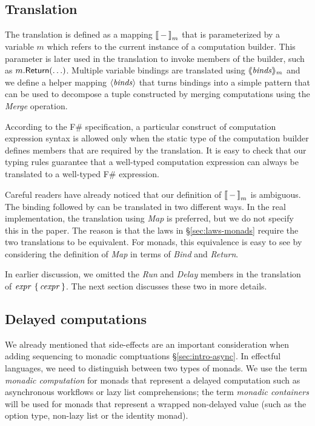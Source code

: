 \documentclass[runningheads,a4paper]{llncs}
\begin{document}

\subsection{Translation}
\label{sec:semantics-transl}

The translation is defined as a mapping $|[ \,-\, |]_m$ that is parameterized by a variable $m$ which
refers to the current instance of a computation builder. This parameter is later used in the
translation to invoke members of the builder, such as $m.\textnormal{\sffamily Return}(\ldots)$. Multiple 
variable bindings are translated using $\langle\hspace{-0.25em}\langle \textnormal{\emph{binds}} \rangle\hspace{-0.25em}\rangle_m$ and we define a helper mapping 
$\langle \textnormal{\emph{binds}} \rangle$ that turns bindings into a simple pattern that can be used to decompose a tuple
constructed by merging computations using the \emph{Merge} operation.

According to the F\# specification, a particular construct of computation expression syntax is
allowed only when the static type of the computation builder defines members that are required
by the translation. It is easy to check that our typing rules guarantee that a well-typed computation
expression can always be translated to a well-typed F\# expression.

Careful readers have already noticed that our definition of $|[ \,-\, |]_m$ is ambiguous. The 
 binding followed by  can be translated in two different ways. In the
real implementation, the translation using \emph{Map} is preferred, but we do not specify this in
the paper. The reason is that the laws in \S\ref{sec:laws-monads} require the two translations to
be equivalent. For monads, this equivalence is easy to see by considering the definition of
\emph{Map} in terms of \emph{Bind} and \emph{Return}.

In earlier discussion, we omitted the \emph{Run} and \emph{Delay} members in the translation of
$\textnormal{\emph{expr}}~\{\,\textnormal{\emph{cexpr}}\,\}$. The next section discusses these two in more details.


\subsection{Delayed computations}
\label{sec:semantics-delayed}

We already mentioned that side-effects are an important consideration when adding sequencing to
monadic comptuations \S\ref{sec:intro-async}. In effectful languages, we need to distinguish 
between two types of monads. We use the term \emph{monadic computation} for monads that represent 
a delayed computation such as asynchronous workflows or lazy list comprehensions; the term 
\emph{monadic containers} will be used for monads that represent a wrapped non-delayed value
(such as the option type, non-lazy list or the identity monad).
\end{document}
